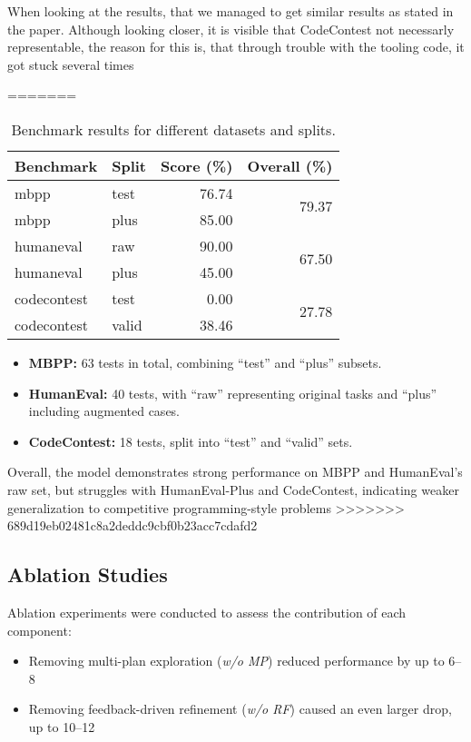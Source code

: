 \documentclass[11pt,a4paper]{article}
\begin{document}
When looking at the results, that we managed to get similar results as stated in the paper.
Although looking closer, it is visible that CodeContest not necessarly representable, the reason for this is, that through trouble with the tooling code, it got stuck several times

=======

\begin{table}[h]
\centering
\begin{tabular}{l l r r}
  \toprule
  \textbf{Benchmark} & \textbf{Split} & \textbf{Score (\%)} & \textbf{Overall (\%)} \\
  \midrule
  mbpp        & test  & 76.74 & \multirow{2}{*}{79.37} \\
  mbpp        & plus  & 85.00 & \\
  \midrule
  humaneval   & raw   & 90.00 & \multirow{2}{*}{67.50} \\
  humaneval   & plus  & 45.00 & \\
  \midrule
  codecontest & test  &  0.00 & \multirow{2}{*}{27.78} \\
  codecontest & valid & 38.46 & \\
  \bottomrule
\end{tabular}
\caption{Benchmark results for different datasets and splits.}
\label{tab:benchmark_results}
\end{table}

\begin{itemize}
  \item \textbf{MBPP:} 63 tests in total, combining “test” and “plus” subsets.
  \item \textbf{HumanEval:} 40 tests, with “raw” representing original tasks and “plus” including augmented cases.
  \item \textbf{CodeContest:} 18 tests, split into “test” and “valid” sets.
\end{itemize}

\noindent
Overall, the model demonstrates strong performance on MBPP and HumanEval’s raw set, but 
struggles with HumanEval-Plus and CodeContest, indicating weaker generalization to 
competitive programming-style problems
>>>>>>> 689d19eb02481c8a2deddc9cbf0b23acc7cdafd2


\subsection{Ablation Studies}
Ablation experiments were conducted to assess the contribution of each component:
\begin{itemize}
\item Removing multi-plan exploration (\textit{w/o MP}) reduced performance by up to 6–8%
\item Removing feedback-driven refinement (\textit{w/o RF}) caused an even larger drop, up to 10–12%
\end{itemize}
\end{document}
